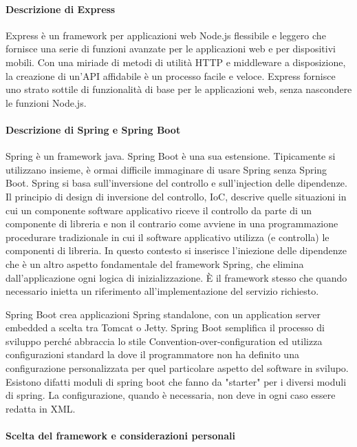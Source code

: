 \documentclass[a4paper,11pt]{article}
\begin{document}
\paragraph{Descrizione di Express}

Express è un framework per applicazioni web Node.js flessibile e leggero che fornisce una serie di funzioni avanzate per le applicazioni web e per dispositivi mobili. Con una miriade di metodi di utilità HTTP e middleware a disposizione, la creazione di un'API affidabile è un processo facile e veloce. Express fornisce uno strato sottile di funzionalità di base per le applicazioni web, senza nascondere le funzioni Node.js. \cite{expressjsExpressFramework}

\paragraph{Descrizione di Spring e Spring Boot}

Spring è un framework java. Spring Boot è una sua estensione. Tipicamente si utilizzano insieme, è ormai difficile immaginare di usare Spring senza Spring Boot. Spring si basa sull'inversione del controllo e sull'injection delle dipendenze. Il principio di design di inversione del controllo, IoC, descrive quelle situazioni in cui un componente software applicativo riceve il controllo da parte di un componente di libreria e non il contrario come avviene in una programmazione procedurare tradizionale in cui il software applicativo utilizza (e controlla) le componenti di libreria. In questo contesto si inserisce l'iniezione delle dipendenze che è un altro aspetto fondamentale del framework Spring, che elimina dall'applicazione ogni logica di inizializzazione. È il framework stesso che quando necessario inietta un riferimento all'implementazione del servizio richiesto. \cite{wikipediaInversioneControllo}

Spring Boot crea applicazioni Spring standalone, con un application server embedded a scelta tra Tomcat o Jetty.
Spring Boot semplifica il processo di sviluppo perché abbraccia lo stile Convention-over-configuration ed utilizza configurazioni standard la dove il programmatore non ha definito una configurazione personalizzata per quel particolare aspetto del software in svilupo. Esistono difatti moduli di spring boot che fanno da "starter" per i diversi moduli di spring. La configurazione, quando è necessaria, non deve in ogni caso essere redatta in XML. \cite{wikipediaSpringBoot}

\paragraph{Scelta del framework e considerazioni personali }
\end{document}
